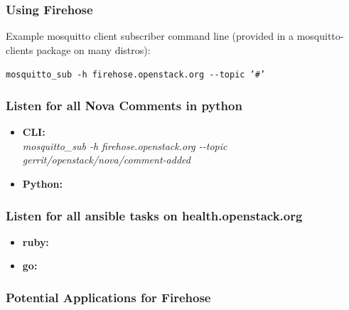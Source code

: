\documentclass[aspectratio=169,11pt,hyperref={colorlinks=true}]{beamer}
\begin{document}
\begin{frame}
\begin{columns}[T]
\begin{column}{.48\textwidth}
        \end{column}
    \end{columns}
\end{frame}

\begin{frame}
    \frametitle{Using Firehose}
    Example mosquitto client subscriber command line (provided in a
mosquitto-clients package on many distros):

    \begin{center}
        \texttt{mosquitto\_sub \--h firehose.openstack.org \--\--topic '\#'}
    \end{center}
\end{frame}

\begin{frame}
    \frametitle{Listen for all Nova Comments in python}
    \begin{itemize}
        \item \textbf{CLI:}\\
            \textit{mosquitto\_sub \--h firehose.openstack.org \--\--topic gerrit/openstack/nova/comment-added}
        \item \textbf{Python:}\\
            
    \end{itemize}
\end{frame}

\begin{frame}
    \frametitle{Listen for all ansible tasks on health.openstack.org}
    \begin{itemize}
        \item \textbf{ruby:} \\
            
    \end{itemize}
\end{frame}

\begin{frame}
    \begin{itemize}
        \item \textbf{go:} \\
            
    \end{itemize}
\end{frame}

\begin{frame}
    \frametitle{Potential Applications for Firehose}
\end{frame}
\end{document}
